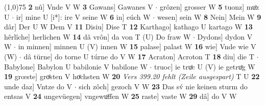 \documentclass[8pt,a4paper,notitlepage]{article}
\begin{document}
\begin{table}[ht]
\begin{minipage}[t]{0.5\linewidth}
\line(1,0){75} \newline
\textbf{2} nû] Vnde V W \textbf{3} Gawans] Gawanes V  $\cdot$ grôzen] grosser W \textbf{5} tuonz] muͦz U  $\cdot$ ir] mine U [i*]: ire V seine W \textbf{6} in] eúch W  $\cdot$ wesen] sein W \textbf{8} Nein] Mein W \textbf{9} dâr] Der U W Dem V \textbf{11} Disiu] Dise T \textbf{12} Karthago] kathago U kartago W \textbf{13} hêrlîche] herlichen W \textbf{14} dâ vrôn] da von T (U) Do fraw W  $\cdot$ Dydons] dydon V W  $\cdot$ in minnen] minnen U (V) innen W \textbf{15} palase] palast W \textbf{16} wie] Vnde wie V (W)  $\cdot$ dâ türne] do torne U túrne do V W \textbf{17} Acraton] Acroton T \textbf{18} diu] die T  $\cdot$ Babylone] Babylon U babilonie V babilone W  $\cdot$ truoc] ie truͦc U (V) ie getruͦg W \textbf{19} grœste] groͤsten V hoͤchsten W \textbf{20} \textit{Vers 399.20 fehlt (Zeile ausgespart)} T U  \textbf{22} unde daz] Vntze do V  $\cdot$ sich zôch] gezoch V W \textbf{23} Das sv́ nie keinen sturm do entsas V \textbf{24} ungevüegen] vngewuͦffen W \textbf{25} raste] vaste W \textbf{29} dâ] do V W \newline
\end{minipage}
\end{table}
\end{document}
